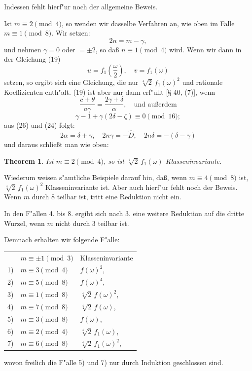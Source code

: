 \documentclass[12pt,a4paper]{article}
\theoremstyle{plain}
\newtheorem{theorem}{Theorem}[section]
\theoremstyle{definition}
\theoremstyle{remark}
\begin{document}
Indessen fehlt hierf"ur noch der allgemeine Beweis.

Ist $m \equiv 2 \pmod{4}$, so wenden wir dasselbe Verfahren an, wie oben im Falle $m \equiv 1 \pmod{8}$. Wir setzen:
\begin{equation}\label{eq:24}
2n = m - \gamma,
\end{equation}
und nehmen $\gamma = 0$ oder $= \pm 2$, so da\ss{} $n \equiv 1 \pmod{4}$ wird. Wenn wir dann in der Gleichung (19)
\begin{equation}\label{eq:25}
u = f_1\left(\frac{\omega}{2}\right), \quad v = f_1(\omega)
\end{equation}
setzen, so ergibt sich eine Gleichung, die nur $\sqrt[4]{2}\, f_1(\omega)^2$ und rationale Koeffizienten enth"alt. (19) ist aber nur dann erf"ullt [\S{} 40, (7)], wenn
\begin{equation}\label{eq:26}
\frac{c + \theta}{a\gamma} = \frac{2\gamma + \delta}{\alpha}, \quad \text{und au\ss{}erdem}
\end{equation}
\begin{equation}\label{eq:27}
\gamma - 1 + \gamma(2\delta - \zeta) \equiv 0 \pmod{16};
\end{equation}
aus (26) und (24) folgt:
\begin{equation}\label{eq:28}
2\alpha = \delta + \gamma, \quad 2n\gamma = -\hat{D}, \quad 2n\delta = -(\delta - \gamma)
\end{equation}
und daraus schlie\ss{}t man wie oben:

\begin{theorem}
Ist $m \equiv 2 \pmod{4}$, so ist $\sqrt[4]{2}\, f_1(\omega)$ Klasseninvariante.
\end{theorem}

Wiederum weisen s"amtliche Beispiele darauf hin, da\ss{}, wenn $m \equiv 4 \pmod{8}$ ist, $\sqrt[4]{2}\, f_1(\omega)^2$ Klasseninvariante ist. Aber auch hierf"ur fehlt noch der Beweis. Wenn $m$ durch 8 teilbar ist, tritt eine Reduktion nicht ein.

In den F"allen 4. bis 8. ergibt sich nach 3. eine weitere Reduktion auf die dritte Wurzel, wenn $m$ nicht durch 3 teilbar ist.

Demnach erhalten wir folgende F"alle:
\begin{center}
\begin{tabular}{cll}
& $m \equiv \pm 1 \pmod{3}$ & Klasseninvariante \\
1) & $m \equiv 3 \pmod{4}$ & $f(\omega)^2$, \\
2) & $m \equiv 5 \pmod{8}$ & $f(\omega)^4$, \\
3) & $m \equiv 1 \pmod{8}$ & $\sqrt[4]{2}\, f(\omega)^2$, \\
4) & $m \equiv 7 \pmod{8}$ & $\sqrt[4]{2}\, f(\omega)$, \\
5) & $m \equiv 3 \pmod{8}$ & $f(\omega)$, \\
6) & $m \equiv 2 \pmod{4}$ & $\sqrt[4]{2}\, f_1(\omega)$, \\
7) & $m \equiv 6 \pmod{8}$ & $\sqrt[4]{2}\, f_1(\omega)^2$,
\end{tabular}
\end{center}
wovon freilich die F"alle 5) und 7) nur durch Induktion geschlossen sind.
\end{document}
